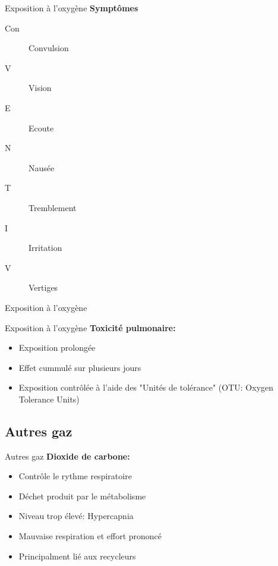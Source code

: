 	\begin{frame}{Exposition à l'oxygène}
		\textbf{Symptômes}	
		\begin{description}
			\item[Con]Convulsion
			\item[V]Vision
			\item[E]Ecoute
			\item[N]Nausée
			\item[T]Tremblement
			\item[I]Irritation
			\item[V]Vertiges
		\end{description}
	\end{frame}

	\begin{frame}{Exposition à l'oxygène}  
	\end{frame}

	\begin{frame}{Exposition à l'oxygène}
		\textbf{Toxicité pulmonaire:}	
		\begin{itemize}
			\item Exposition prolongée
			\item Effet cummulé sur plusieurs jours
			\item Exposition contrôlée à l'aide des "Unités  de tolérance" (OTU: Oxygen Tolerance Units)
		\end{itemize}
	\end{frame}

\subsection{Autres gaz}
	\begin{frame}{Autres gaz}  
		\textbf{Dioxide de carbone:}	
		\begin{itemize}
			\item Contrôle le rythme respiratoire
			\item Déchet produit par le métabolisme
			\item Niveau trop élevé: Hypercapnia
			\item Mauvaise respiration et effort prononcé
			\item Principalment lié aux recycleurs
		\end{itemize}
	\end{frame}

